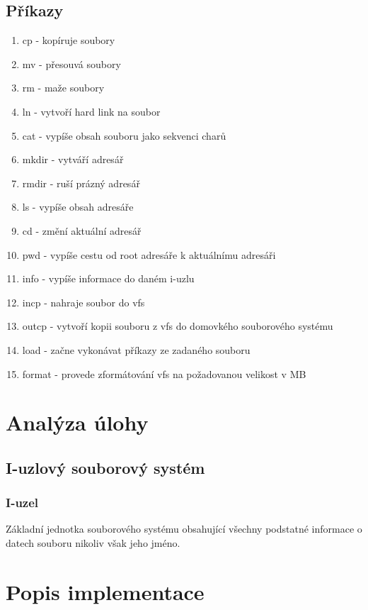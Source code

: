 \documentclass[12pt, a4paper]{report}
\begin{document}
\section{Příkazy}
\begin{enumerate}
 \item cp - kopíruje soubory
 \item mv - přesouvá soubory
 \item rm - maže soubory
 \item ln - vytvoří hard link na soubor
 \item cat - vypíše obsah souboru jako sekvenci charů
 
 \item mkdir - vytváří adresář
 \item rmdir - ruší prázný adresář
 \item ls - vypíše obsah adresáře
 

 \item cd - změní aktuální adresář
 \item pwd - vypíše cestu od root adresáře k aktuálnímu adresáři
 \item info - vypíše informace do daném i-uzlu
 
 \item incp - nahraje soubor do vfs
 \item outcp - vytvoří kopii souboru z vfs do domovkého souborového systému
 \item load - začne vykonávat příkazy ze zadaného souboru
 \item format - provede zformátování vfs na požadovanou velikost v MB
\end{enumerate}





\chapter{Analýza úlohy}
\section{I-uzlový souborový systém}
\subsection{I-uzel}
Základní jednotka souborového systému obsahující všechny podstatné informace o datech souboru nikoliv však jeho jméno.


\chapter{Popis implementace}
\end{document}
